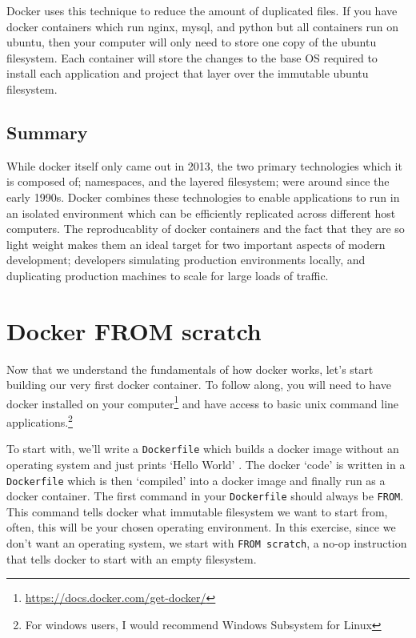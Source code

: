 Docker uses this technique to reduce the amount of duplicated files.
If you have docker containers which run nginx, mysql, and python but all containers run on ubuntu,
then your computer will only need to store one copy of the ubuntu filesystem.
Each container will store the changes to the base OS required to install each application and project that layer over the immutable ubuntu filesystem.

\subsection{Summary}
While docker itself only came out in 2013, the two primary technologies which it is composed of; namespaces, and the layered filesystem;
were around since the early 1990s.
Docker combines these technologies to enable applications to run in an isolated environment which can be efficiently replicated across different host computers.
The reproducablity of docker containers and the fact that they are so light weight makes them an ideal target for two important aspects of modern development;
developers simulating production environments locally, and duplicating production machines to scale for large loads of traffic.


\section{Docker FROM scratch}
Now that we understand the fundamentals of how docker works, let's start building our very first docker container.
To follow along, you will need to have docker installed on your
computer\footnote{\url{https://docs.docker.com/get-docker/}} and have access to basic unix command line
applications.\footnote{For windows users, I would recommend Windows Subsystem for Linux}

To start with, we'll write a \texttt{Dockerfile} which builds a docker image without an operating system and just prints `Hello World'
\cite{docker-from-scratch}.
The docker `code' is written in a \texttt{Dockerfile} which is then `compiled' into a docker image and finally run as a docker container.
The first command in your \texttt{Dockerfile} should always be \texttt{FROM}.
This command tells docker what immutable filesystem we want to start from, often, this will be your chosen operating environment.
In this exercise, since we don't want an operating system, we start with \texttt{FROM scratch},
a no-op instruction that tells docker to start with an empty filesystem.

